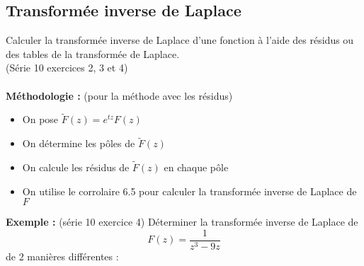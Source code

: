 \subsection{Transformée inverse de Laplace}
Calculer la transformée inverse de Laplace d’une fonction à l'aide des résidus ou des tables de la transformée de Laplace. \\
(Série 10 exercices 2, 3 et 4) \\
\\
\textbf{Méthodologie :} (pour la méthode avec les résidus)
\begin{itemize}
    \item On pose $\widetilde{F}(z) = e^{tz}F(z)$
    \item On détermine les pôles de $\widetilde{F}(z)$
    \item On calcule les résidus de $\widetilde{F}(z)$ en chaque pôle
    \item On utilise le corrolaire 6.5 pour calculer la transformée inverse de Laplace de $F$
\end{itemize}
\textbf{Exemple :} (série 10 exercice 4)
Déterminer la transformée inverse de Laplace de
$$F(z) = \frac{1}{z^3-9z}$$
de 2 manières différentes :

